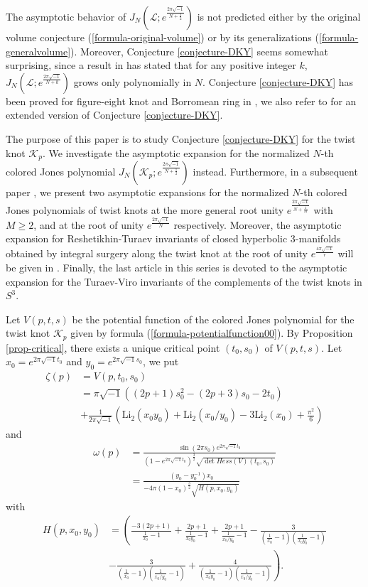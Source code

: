 \documentclass[12pt]{amsart}
\begin{document}
The asymptotic behavior of  $J_{N}(\mathcal{L}; e^{\frac{2\pi\sqrt{-1}}{N+\frac{1}{2}}})$  is not predicted
either by the original volume conjecture (\ref{formula-original-volume})  or by its generalizations (\ref{formula-generalvolume}).  Moreover, Conjecture \ref{conjecture-DKY}  seems somewhat surprising, since a result in \cite{GL11,CLZ15} has stated that for any positive integer $k$, $J_{N}(\mathcal{L};e^{\frac{2\pi\sqrt{-1}}{N+k}})$ grows only polynomially in $N$. Conjecture \ref{conjecture-DKY} has been proved for figure-eight knot and Borromean ring in \cite{DKY18},  we also refer to \cite{Wong19} for an extended version of Conjecture \ref{conjecture-DKY}. 

The purpose of this paper is to study Conjecture \ref{conjecture-DKY} for the twist knot $\mathcal{K}_p$. We investigate the asymptotic expansion for the normalized $N$-th colored Jones polynomial  $J_N(\mathcal{K}_p;e^{\frac{2\pi \sqrt{-1}}{N+\frac{1}{2}}})$ instead. Furthermore, in a subsequent paper \cite{CZ23-2}, we present two asymptotic expansions  for the normalized $N$-th colored Jones polynomials of twist knots at the more general root unity $e^{\frac{2\pi \sqrt{-1}}{N+\frac{1}{M}}}$ with $M\geq 2$, and at the root of unity  $e^{\frac{2\pi \sqrt{-1}}{N}}$ respectively. Moreover, the asymptotic expansion for  Reshetikhin-Turaev invariants of closed hyperbolic 3-manifolds obtained by integral surgery along the twist knot at the root of unity   $e^{\frac{4\pi\sqrt{-1}}{r}}$ will be given in \cite{CZ23-3}. Finally, the last article \cite{CZ23-3} in this series is devoted to the asymptotic expansion for the Turaev-Viro invariants of the complements of the twist knots in $S^3$.

Let $V(p,t,s)$ be the potential function of the colored Jones polynomial for the twist knot $\mathcal{K}_p$ given by formula (\ref{formula-potentialfunction00}). 
By Proposition \ref{prop-critical}, there exists a unique critical point $(t_0,s_0)$ of $V(p,t,s)$. Let $x_0=e^{2\pi\sqrt{-1}t_0}$ and $y_0=e^{2\pi\sqrt{-1}s_0}$, we put
\begin{align}
  \zeta(p)&=V(p,t_0,s_0)\\\nonumber
  &=\pi \sqrt{-1}\left((2p+1)s_0^2-(2p+3)s_0-2t_0\right)\\\nonumber
    &+\frac{1}{2\pi\sqrt{-1}}\left(\text{Li}_2(x_0y_0)+\text{Li}_2(x_0/y_0)-3\text{Li}_2(x_0)+\frac{\pi^2}{6}\right)  
\end{align}
and 
\begin{align} \label{formula-omegap}
    \omega(p)&=\frac{\sin (2\pi s_0)e^{2\pi\sqrt{-1}t_0}}{(1-e^{2\pi\sqrt{-1}t_0})^{\frac{3}{2}}\sqrt{\det Hess(V)(t_0,s_0)}}\\\nonumber
    &=\frac{(y_0-y_0^{-1})x_0}{-4\pi (1-x_0)^\frac{3}{2}\sqrt{H(p,x_0,y_0)}}
\end{align}
with
\begin{align}
    H(p,x_0,y_0)&=\left(\frac{-3(2p+1)}{\frac{1}{x_0}-1}+\frac{2p+1}{\frac{1}{x_0y_0}-1}+\frac{2p+1}{\frac{1}{x_0/y_0}-1}-\frac{3}{(\frac{1}{x_0}-1)(\frac{1}{x_0y_0}-1)}\right.\\\nonumber
    &\left.-\frac{3}{(\frac{1}{x_0}-1)(\frac{1}{x_0/y_0}-1)}+\frac{4}{(\frac{1}{x_0y_0}-1)(\frac{1}{x_0/y_0}-1)}\right).
\end{align}
\end{document}
